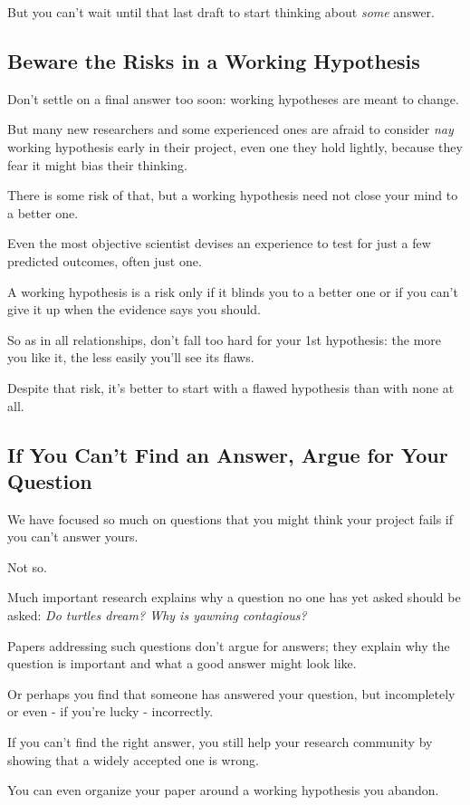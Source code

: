\documentclass[oneside]{book}
\numberwithin{equation}{section}
\begin{document}
But you can't wait until that last draft to start thinking about \textit{some} answer.

\subsection{Beware the Risks in a Working Hypothesis}
Don't settle on a final answer too soon: working hypotheses are meant to change.

But many new researchers and some experienced ones are afraid to consider \textit{nay} working hypothesis early in their project, even one they hold lightly, because they fear it might bias their thinking.

There is some risk of that, but a working hypothesis need not close your mind to a better one.

%
Even the most objective scientist devises an experience to test for just a few predicted outcomes, often just one.

A working hypothesis is a risk only if it blinds you to a better one or if you can't give it up when the evidence says you should.

So as in all relationships, don't fall too hard for your 1st hypothesis: the more you like it, the less easily you'll see its flaws.

Despite that risk, it's better to start with a flawed hypothesis than with none at all.

\subsection{If You Can't Find an Answer, Argue for Your Question}
We have focused so much on questions that you might think your project fails if you can't answer yours.

Not so.

Much important research explains why a question no one has yet asked should be asked: \textit{Do turtles dream? Why is yawning contagious?}

Papers addressing such questions don't argue for answers; they explain why the question is important and what a good answer might look like.

%
Or perhaps you find that someone has answered your question, but incompletely or even - if you're lucky - incorrectly.

If you can't find the right answer, you still help your research community by showing that a widely accepted one is wrong.

You can even organize your paper around a working hypothesis you abandon.
\end{document}
